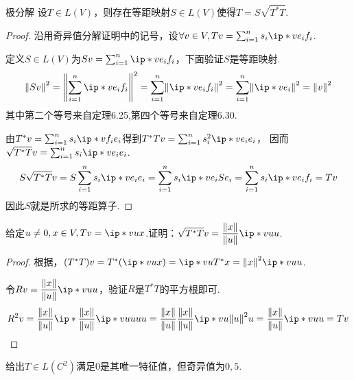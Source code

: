 \begin{theorem}[7.93*]\label{thm 7.93*} 极分解 \:
    设\(T \in L(V)\)，则存在等距映射\(S \in L(V)\)使得\(T=S\sqrt{T^*T}\).
\end{theorem}

\begin{proof}
    沿用奇异值分解证明中的记号，设\(\forall v \in V,Tv=\sum_{i=1}^n s_i\ip*{v}{e_i}f_i\).

    定义\(S \in L(V)\)为\(Sv=\sum_{i=1}^n \ip*{v}{e_i}f_i\)，下面验证\(S\)是等距映射.
    \begin{align*}
        \norm*{Sv}^2=\norm*{\sum_{i=1}^n \ip*{v}{e_i}f_i}^2=\sum_{i=1}^n \norm*{\ip*{v}{e_i}f_i}^2
        =\sum_{i=1}^n \norm*{\ip*{v}{e_i}}^2=\norm*{v}^2
    \end{align*}
    其中第二个等号来自定理6.25,第四个等号来自定理6.30.
    
    由\(T^*v=\sum_{i=1}^n s_i\ip*{v}{f_i}e_i\)得到\(T^*Tv=\sum_{i=1}^n s_i^2 \ip*{v}{e_i}e_i\)，
    因而\(\sqrt{T^*T}v=\sum_{i=1}^n s_i\ip*{v}{e_i}e_i\).
    \begin{align*}
        S\sqrt{T^*T}v=S\sum_{i=1}^n s_i\ip*{v}{e_i}e_i=\sum_{i=1}^n s_i\ip*{v}{e_i}Se_i
        =\sum_{i=1}^n s_i\ip*{v}{e_i}f_i=Tv
    \end{align*}
    因此\(S\)就是所求的等距算子.
\end{proof}

\newpage

\begin{problem}[1]\label{7.D.1}
    给定\(u \ne 0,x \in V,Tv=\ip*{v}{u}x\).证明：\(\sqrt{T^*T}v=\dfrac{\norm*{x}}{\norm*{u}}\ip*{v}{u}u\).
\end{problem}

\begin{proof}
    根据，\((T^*T)v=T^*(\ip*{v}{u}x)=\ip*{v}{u}T^*x=\norm*{x}^2\ip*{v}{u}u\).

    令\(Rv=\dfrac{\norm*{x}}{\norm*{u}}\ip*{v}{u}u\)，验证\(R\)是\(T^*T\)的平方根即可.
        \begin{align*}
            R^2v=\dfrac{\norm*{x}}{\norm*{u}}\ip*{\dfrac{\norm*{x}}{\norm*{u}}\ip*{v}{u}u}{u}u
            =\dfrac{\norm*{x}}{\norm*{u}}\dfrac{\norm*{x}}{\norm*{u}}\ip*{v}{u}\norm*{u}^2u
            =\dfrac{\norm*{x}}{\norm*{u}}\ip*{v}{u}u=Tv
        \end{align*}
\end{proof}

\begin{problem}[2]\label{7.D.2}
    给出\(T \in L(C^2)\)满足\(0\)是其唯一特征值，但奇异值为\(0,5\).
\end{problem}

